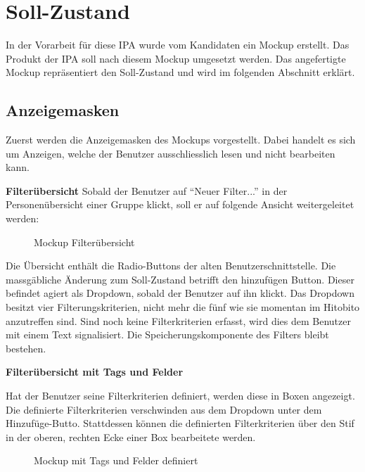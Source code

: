 \newpage

\section{Soll-Zustand}
In der Vorarbeit für diese IPA wurde vom Kandidaten ein Mockup erstellt. Das Produkt der IPA soll nach diesem Mockup umgesetzt werden.
Das angefertigte Mockup repräsentiert den Soll-Zustand und wird im folgenden Abschnitt erklärt.

\subsection{Anzeigemasken}
Zuerst werden die Anzeigemasken des Mockups vorgestellt. Dabei handelt es sich um Anzeigen, welche der Benutzer ausschliesslich lesen und nicht
bearbeiten kann.

\textbf{Filterübersicht}
Sobald der Benutzer auf ``Neuer Filter...'' in der Personenübersicht einer Gruppe klickt, soll er auf folgende Ansicht weitergeleitet werden:

\begin{figure}[h]
   \centering
   \caption{Mockup Filterübersicht}
\end{figure}

Die Übersicht enthält die Radio-Buttons der alten Benutzerschnittstelle. Die massgäbliche Änderung zum Soll-Zustand betrifft den hinzufügen Button.
Dieser befindet agiert als Dropdown, sobald der Benutzer auf ihn klickt. Das Dropdown besitzt vier Filterungskriterien, nicht mehr die fünf wie sie momentan
im Hitobito anzutreffen sind. Sind noch keine Filterkriterien erfasst, wird dies dem Benutzer mit einem Text signalisiert.
Die Speicherungskomponente des Filters bleibt bestehen.

\textbf{Filterübersicht mit Tags und Felder}

Hat der Benutzer seine Filterkriterien definiert, werden diese in Boxen angezeigt.
Die definierte Filterkriterien verschwinden aus dem Dropdown unter dem Hinzufüge-Butto. Stattdessen können 
die definierten Filterkriterien über den Stif in der oberen, rechten Ecke einer Box bearbeitete werden.

\begin{figure}[h]
   \centering
   \caption{Mockup mit Tags und Felder definiert}
\end{figure}

